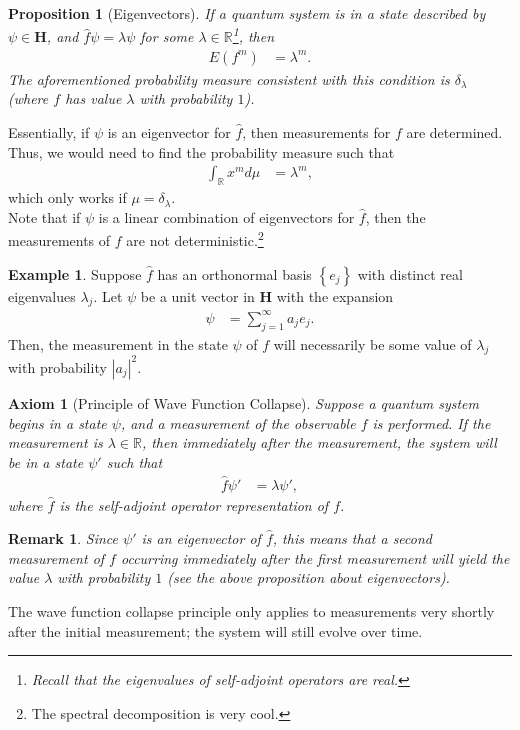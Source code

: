 \documentclass[12pt]{extarticle}
\newtheorem*{remark}{Remark}
\newcommand{\R}{\mathbb{R}}
\newcommand{\set}[1]{\left\{#1\right\}}
\theoremstyle{plain}
\newtheorem*{axiom}{Axiom}%
\newtheorem*{proposition}{Proposition}%
\theoremstyle{definition}
\newtheorem*{example}{Example}
\theoremstyle{remark}
\begin{document}
  \begin{proposition}[Eigenvectors]
    If a quantum system is in a state described by $\psi\in \mathbf{H}$, and $\hat{f}\psi = \lambda\psi$ for some $\lambda\in \R$\footnote{Recall that the eigenvalues of self-adjoint operators are real.}, then
    \begin{align*}
      E(f^{m}) &= \lambda^{m}.
    \end{align*}
    The aforementioned probability measure consistent with this condition is $\delta_{\lambda}$ (where $f$ has value $\lambda$ with probability $1$).
  \end{proposition}
  Essentially, if $\psi$ is an eigenvector for $\hat{f}$, then measurements for $f$ are determined. Thus, we would need to find the probability measure such that
  \begin{align*}
    \int_{\R}x^{m}d\mu &= \lambda^{m},
  \end{align*}
  which only works if $\mu = \delta_{\lambda}$.\\

  Note that if $\psi$ is a linear combination of eigenvectors for $\hat{f}$, then the measurements of $f$ are not deterministic.\footnote{The spectral decomposition is very cool.}
  \begin{example}
    Suppose $\hat{f}$ has an orthonormal basis $\set{e_j}$ with distinct real eigenvalues $\lambda_j$. Let $\psi$ be a unit vector in $\mathbf{H}$ with the expansion
    \begin{align*}
      \psi &= \sum_{j=1}^{\infty}a_je_j.
    \end{align*}
    Then, the measurement in the state $\psi$ of $f$ will necessarily be some value of $\lambda_j$ with probability $|a_j|^2$.
  \end{example}
  \begin{axiom}[Principle of Wave Function Collapse]
    Suppose a quantum system begins in a state $\psi$, and a measurement of the observable $f$ is performed. If the measurement is $\lambda \in \R$, then immediately after the measurement, the system will be in a state $\psi'$ such that
    \begin{align*}
      \hat{f}\psi' &= \lambda \psi',
    \end{align*}
    where $\hat{f}$ is the self-adjoint operator representation of $f$.
  \end{axiom}
  \begin{remark}
    Since $\psi'$ is an eigenvector of $\hat{f}$, this means that a second measurement of $f$ occurring immediately after the first measurement will yield the value $\lambda$ with probability $1$ (see the above proposition about eigenvectors).
  \end{remark}
  The wave function collapse principle only applies to measurements very shortly after the initial measurement; the system will still evolve over time.
\end{document}
